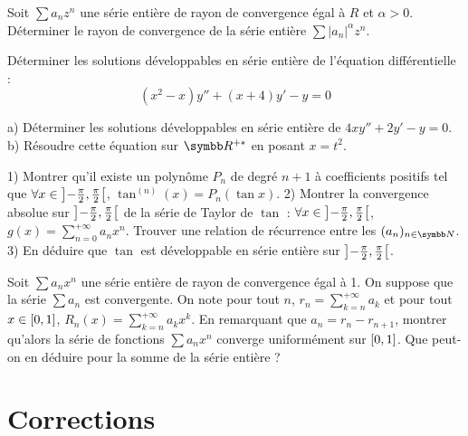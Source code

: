 \begin{exercice}
Soit $\sum a_{n}z^{n}$ une série entière de rayon de convergence égal à $R$ et $\alpha>0$. 
Déterminer le rayon de convergence de la série entière $\sum|a_{n}|^{\alpha}z^{n}$. 
\end{exercice}

\begin{exercice}
Déterminer les solutions développables en série entière de l'équation différentielle :
$$ (x^{2}-x)y''+(x+4)y'-y=0 $$ 
\end{exercice}

\begin{exercice}
a) Déterminer les solutions développables en série entière de $4xy''+2y'-y=0$. 
b) Résoudre cette équation sur $\R^{+*}$ en posant $x=t^{2}$. 
\end{exercice}

\begin{exercice}
1) Montrer qu'il existe un polynôme $P_{n}$ de degré $n+1$ à coefficients positifs tel que $\forall x\in\left]-\frac{\pi}{2}, \frac{\pi}{2}\right[$, $\tan^{(n)}(x)=P_{n}(\tan x)$. 
2) Montrer la convergence absolue sur $\left]-\frac{\pi}{2}, \frac{\pi}{2}\right[$ de la série de Taylor de $\tan$ : $\forall x\in\left]-\frac{\pi}{2}, \frac{\pi}{2}\right[$, $g(x)=\sum_{n=0}^{+ \infty}a_{n}x^{n}$. 
Trouver une relation de récurrence entre les $(a_{n})_{n\in\N}$. 
3) En déduire que $\tan$ est développable en série entière sur $\left]-\frac{\pi}{2}, \frac{\pi}{2}\right[$. 
\end{exercice}

\begin{exercice}
Soit $\sum a_{n}x^{n}$ une série entière de rayon de convergence égal à 1. 
On suppose que la série $\sum a_{n}$ est convergente. 
On note pour tout $n$, $r_{n}=\sum_{k=n}^{+\infty}a_{k}$ et pour tout $x\in\left[0, 1\right]$, $R_{n}(x)=\sum_{k=n}^{+\infty}a_{k}x^{k}$. 
En remarquant que $a_{n}=r_{n}-r_{n+1}$, montrer qu'alors la série de fonctions $\sum a_{n}x^{n}$ converge uniformément sur $\left[0, 1\right]$. 
Que peut-on en déduire pour la somme de la série entière ? 
\end{exercice}


\section{Corrections}

